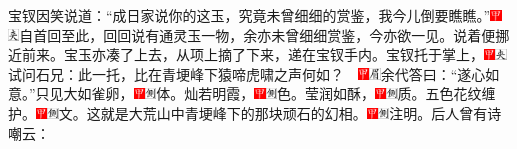 宝钗因笑说道：“成日家说你的这玉，究竟未曾细细的赏鉴，我今儿倒要瞧瞧。”{\includegraphics[width=3mm]{../Images/00002}\includegraphics[width=3mm]{../Images/00012}\footnotesize \kaishu 自首回至此，回回说有通灵玉一物，余亦未曾细细赏鉴，今亦欲一见。}说着便挪近前来。宝玉亦凑了上去，从项上摘了下来，递在宝钗手内。宝钗托于掌上，{\includegraphics[width=3mm]{../Images/00002}\includegraphics[width=3mm]{../Images/00012}\footnotesize \kaishu 试问石兄：此一托，比在青埂峰下猿啼虎啸之声何如？　\includegraphics[width=3mm]{../Images/00002}\includegraphics[width=3mm]{../Images/00010}\footnotesize \kaishu 余代答曰：“遂心如意。”}只见大如雀卵，{\includegraphics[width=3mm]{../Images/00002}\includegraphics[width=3mm]{../Images/00011}\footnotesize \kaishu 体。}灿若明霞，{\includegraphics[width=3mm]{../Images/00002}\includegraphics[width=3mm]{../Images/00011}\footnotesize \kaishu 色。}莹润如酥，{\includegraphics[width=3mm]{../Images/00002}\includegraphics[width=3mm]{../Images/00011}\footnotesize \kaishu 质。}五色花纹缠护。{\includegraphics[width=3mm]{../Images/00002}\includegraphics[width=3mm]{../Images/00011}\footnotesize \kaishu 文。}这就是大荒山中青埂峰下的那块顽石的幻相。{\includegraphics[width=3mm]{../Images/00002}\includegraphics[width=3mm]{../Images/00011}\footnotesize \kaishu 注明。}后人曾有诗嘲云：

